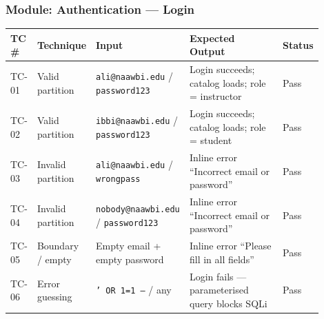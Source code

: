 \documentclass[12pt, a4paper]{article}
\begin{document}
\subsubsection*{Module: Authentication — Login}
\begin{center}\small
\begin{tabular}{@{}p{0.06\linewidth}p{0.13\linewidth}p{0.30\linewidth}p{0.33\linewidth}p{0.08\linewidth}@{}}
  \toprule
  \textbf{TC \#} & \textbf{Technique} & \textbf{Input} & \textbf{Expected Output} & \textbf{Status} \\
  \midrule
  TC-01 & Valid partition   & \texttt{ali@naawbi.edu} / \texttt{password123}    & Login succeeds; catalog loads; role = instructor  & \textcolor{success}{Pass} \\
TC-02 & Valid partition   & \texttt{ibbi@naawbi.edu} / \texttt{password123}   & Login succeeds; catalog loads; role = student     & \textcolor{success}{Pass} \\
  TC-03 & Invalid partition & \texttt{ali@naawbi.edu} / \texttt{wrongpass}      & Inline error ``Incorrect email or password''      & \textcolor{success}{Pass} \\
TC-04 & Invalid partition & \texttt{nobody@naawbi.edu} / \texttt{password123} & Inline error ``Incorrect email or password''      & \textcolor{success}{Pass} \\
  TC-05 & Boundary / empty  & Empty email + empty password                      & Inline error ``Please fill in all fields''        & \textcolor{success}{Pass} \\
TC-06 & Error guessing    & \texttt{' OR 1=1 --} / any                        & Login fails --- parameterised query blocks SQLi   & \textcolor{success}{Pass} \\
  \bottomrule
\end{tabular}
\end{center}
\end{document}
